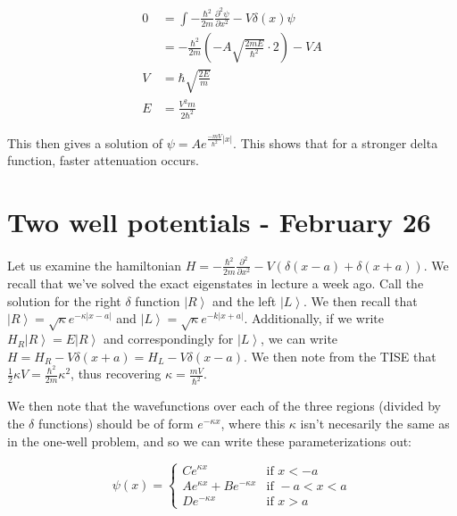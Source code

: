 \documentclass{report}
\begin{document}
\begin{align*}
0 &= \int -\frac{\hbar^2}{2m}\frac{\partial^2\psi}{\partial x^2}-V\delta(x)\psi\\
&= -\frac{\hbar^2}{2m}\left(-A\sqrt{\frac{2mE}{\hbar^2}}\cdot 2\right) - VA\\
V &= \hbar\sqrt{\frac{2E}{m}} \\
E &= \frac{V^2m}{2\hbar^2}
\end{align*}

This then gives a solution of $\psi = Ae^{\frac{-mV}{\hbar^2}|x|}$. This shows that for a stronger delta function, faster attenuation occurs. 

\chapter{Two well potentials - February 26}

Let us examine the hamiltonian $H = -\frac{\hbar^2}{2m}\frac{\partial^2}{\partial x^2} - V(\delta(x-a) + \delta(x+a))$. We recall that we've solved the exact eigenstates in lecture a week ago. Call the solution for the right $\delta$ function $\left|R\right>$ and the left $\left|L\right>$. We then recall that $\left|R\right> = \sqrt{\kappa}e^{-\kappa |x-a|}$ and $\left|L\right> = \sqrt{\kappa}e^{-k|x+a|}$. Additionally, if we write $H_R\left|R\right> = E\left|R\right>$ and correspondingly for $\left|L\right>$, we can write $H = H_R - V\delta(x+a) = H_L - V\delta(x-a)$. We then note from the TISE that $\frac{1}{2}\kappa V = \frac{\hbar^2}{2m}\kappa^2$, thus recovering $\kappa = \frac{mV}{\hbar^2}$.

We then note that the wavefunctions over each of the three regions (divided by the $\delta$ functions) should be of form $e^{-\kappa x}$, where this $\kappa$ isn't necesarily the same as in the one-well problem, and so we can write these parameterizations out:

$$\psi(x) = \begin{cases}Ce^{\kappa x} &\mbox{if } x < -a\\Ae^{\kappa x} + Be^{-\kappa x} & \mbox{if } -a < x < a\\De^{-\kappa x} & \mbox{if } x > a\end{cases}$$
\end{document}
